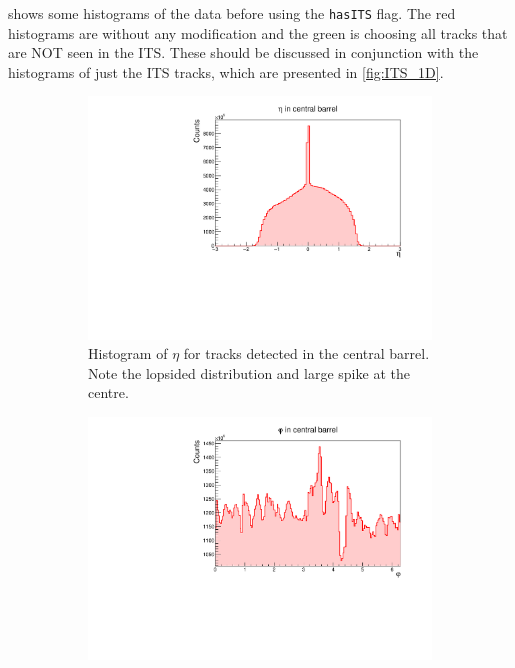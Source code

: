  shows some histograms of the data before using the \texttt{hasITS} flag. The red histograms are without any modification and the green is choosing all tracks that are NOT seen in the ITS. These should be discussed in conjunction with the histograms of just the ITS tracks, which are presented in \cref{fig:ITS_1D}.

\begin{figure}[h]%
    \centering
    \begin{subfigure}[t]{.49\linewidth}
        \centering
        \includegraphics[width=\linewidth]{Plots/pass4_TracksIU_nohasITS/eta.pdf}
        \caption{Histogram of $\eta$ for tracks detected in the central barrel. Note the lopsided distribution and large spike at the centre.}
        \label{fig:nohasITS_eta}
    \end{subfigure}
    \hfill
    \begin{subfigure}[t]{.49\linewidth}
        \centering
        \includegraphics[width=\linewidth]{Plots/pass4_TracksIU_nohasITS/phi.pdf}

\end{subfigure}
\end{figure}

